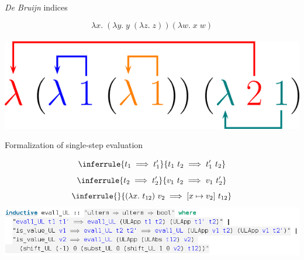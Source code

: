 \documentclass[xcolor=dvipsnames]{beamer}
\begin{document}
\begin{frame}{\emph{De Bruijn} indices}
  \begin{center}
    \Large
    \begin{displaymath}
      \lambda x. \; (\lambda y. \; y \; (\lambda z. \; z)) (\lambda w. \; x \; w)
    \end{displaymath} \\
    \vspace{20pt}
    \includegraphics[scale=1]{de_bruijn.png}
  \end{center}
\end{frame}

\begin{frame}{Formalization of single-step evaluation}
  \begin{center}
    \small
    \begin{displaymath}
      \inferrule {t_1 \implies t_1'}{t_1 \ t_2 \implies t_1' \ t_2}
    \end{displaymath}
    \begin{displaymath}
      \inferrule {t_2 \implies t_2'}{v_1 \ t_2 \implies v_1 \ t_2'}
    \end{displaymath}
    \begin{displaymath}
      \inferrule {}{(\lambda x. \ t_{12}) \ v_2 \implies [x \mapsto v_2] \ t_{12}}
    \end{displaymath}
    \pause
    \vspace{20pt}
    \includegraphics[scale=0.4]{eval1.png}
  \end{center}
\end{frame}

\end{document}
